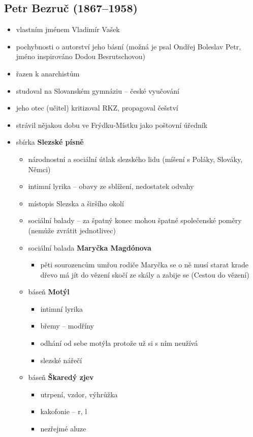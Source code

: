 \subsection{Petr Bezruč (1867--1958)}
\begin{itemize}
\item vlastním jménem Vladimír Vašek
\item pochybnosti o autorství jeho básní (možná je psal Ondřej Boleslav Petr, jméno inspirováno Dodou Besrutschovou)
\item řazen k anarchistům
\item studoval na Slovanském gymnáziu -- české vyučování
\item jeho otec (učitel) kritizoval RKZ, propagoval češství
\item strávil nějakou dobu ve Frýdku-Místku jako poštovní úředník \ra 
\item sbírka \textbf{Slezské písně}
	\begin{itemize}
	\item národnostní a sociální útlak slezského lidu (míšení s Poláky, Slováky, Němci)
	\item intimní lyrika -- obavy ze sblížení, nedostatek odvahy 
	\item místopis Slezska a širšího okolí
	\item sociální balady -- za špatný konec mohou špatné společenské poměry (nemůže zvrátit jednotlivec)
	\item sociální balada \textbf{Maryčka Magdónova}
		\begin{itemize}
		\item pěti sourozencům umřou rodiče \ra Maryčka se o ně musí starat \ra krade dřevo \ra má jít do vězení \ra skočí ze skály a zabije se (Cestou do vězení)
		\end{itemize}
	\item báseň \textbf{Motýl}
		\begin{itemize}
		\item intimní lyrika
		\item břemy -- modříny
		\item odhání od sebe motýla protože už si s ním neužívá
		\item slezské nářečí
		\end{itemize}
	\item báseň \textbf{Škaredý zjev}
		\begin{itemize}
		\item utrpení, vzdor, výhrůžka
		\item kakofonie -- r, l
		\item nezřejmé aluze

\end{itemize}
\end{itemize}
\end{itemize}
